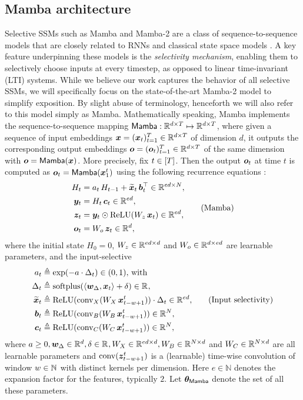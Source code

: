 \subsection{Mamba architecture}
\label{sec:mamba_background}
Selective SSMs such as Mamba and Mamba-2 are a class of sequence-to-sequence models that are closely related to RNNs and classical state space models \cite{mamba2023gu}. A key feature underpinning these models is the \emph{selectivity mechanism}, enabling them to selectively choose inputs at every timestep, as opposed to linear time-invariant (LTI) systems. While we believe our work captures the behavior of all selective SSMs, we will specifically focus on the state-of-the-art Mamba-2 model to simplify exposition. By slight abuse of terminology, henceforth we will also refer to this model simply as Mamba. Mathematically speaking, Mamba implements the sequence-to-sequence mapping $\mathsf{Mamba}: \mathbb{R}^{d \times T} \mapsto \mathbb{R}^{d \times T} $, where given a sequence of input embeddings $\boldsymbol{x} = (\boldsymbol{x}_t)_{t=1}^T \in \mathbb{R}^{d\times T}$ of dimension $d$, it outputs the corresponding output embeddings $\boldsymbol{o} = (\boldsymbol{o}_t)_{t=1}^T \in \mathbb{R}^{d\times T}$ of the same dimension with $\boldsymbol{o} = \mathsf{Mamba}(\boldsymbol{x}) $. More precisely, fix $t \in [T]$. Then the output $\boldsymbol{o}_t$ at time $t$ is computed as $ \boldsymbol{o}_t = \mathsf{Mamba}(\boldsymbol{x}_1^t)$ using the following recurrence equations \cite{dao2024transformers}:
\begin{equation}
\begin{split}
H_t &= a_t \, H_{t-1} + \widetilde{\boldsymbol{x}}_t \, \boldsymbol{b}_t^\top \in \mathbb{R}^{ed \times N}, \\
\boldsymbol{y}_t &= H_t\, \boldsymbol{c}_t \in \mathbb{R}^{ed}, \\
\boldsymbol{z}_t &= \boldsymbol{y}_t \odot \mathrm{ReLU}(W_z \, \boldsymbol{x}_t) \in \mathbb{R}^{ed}, \\
\boldsymbol{o}_t &= W_o\, \boldsymbol{z}_t \in \mathbb{R}^{d},
\end{split}
\label{eq:mamba_block}
\tag{Mamba}     
\end{equation}
where the initial state $H_0 = 0$, $W_z \in \mathbb{R}^{ed \times d}$ and $W_o \in \mathbb{R}^{d\times ed}$ are learnable parameters, and the input-selective
\begin{equation}
\begin{split}
a_t &\triangleq \exp(-a \cdot \Delta_t) \in (0,1), \, \text{with} \\
\Delta_t &\triangleq \mathrm{softplus}(\langle {\boldsymbol{w}_{\Delta}}, {\boldsymbol{x}_t} \rangle+ \delta) \in \mathbb{R}^{}, \\
\widetilde{\boldsymbol{x}}_t  &\triangleq \mathrm{ReLU}(\mathrm{conv}_X(W_X \, \boldsymbol{x}_{t-w+1}^t)) \cdot \Delta_t \in \mathbb{R}^{ed}, \\
\boldsymbol{b}_t &\triangleq \mathrm{ReLU}(\mathrm{conv}_B(W_B \, \boldsymbol{x}_{t-w+1}^t)) \in \mathbb{R}^{N}, \\
\boldsymbol{c}_t &\triangleq \mathrm{ReLU}(\mathrm{conv}_C(W_C \, \boldsymbol{x}_{t-w+1}^t)) \in \mathbb{R}^{N},
\end{split}
\tag{Input selectivity} 
\label{eq:mamba-params}
\end{equation}
where $a \geq  0, \boldsymbol{w}_{\Delta}\in \mathbb{R}^{d}, \delta\in \mathbb{R}^{}, W_X\in \mathbb{R}^{ed \times d}, W_B\in \mathbb{R}^{N \times d}$ and $W_C\in \mathbb{R}^{N\times d}$ are all learnable parameters and $\mathrm{conv}(\boldsymbol{z}_{t-w+1}^t)$ is a (learnable) time-wise convolution of 
window $w \in \mathbb{N}$ with distinct kernels per dimension. Here $e\in\mathbb{N}$ denotes the expansion factor for the features, typically $2$. Let $\boldsymbol{\theta}_{\mathsf{Mamba}}$ denote the set of all these parameters. 

